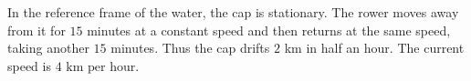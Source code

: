 In the reference frame of the water, the cap is stationary. The rower moves away from it for $15$ minutes at a constant speed and then returns at the same speed, taking another $15$ minutes. Thus the cap drifts $2$ km in half an hour. The current speed is $\boxed{4\text{ km per hour}}$.
